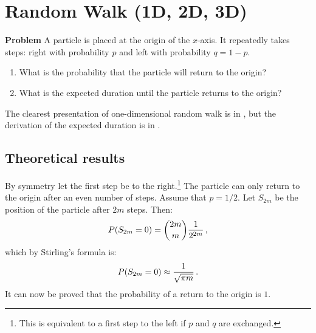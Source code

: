 
\section{Random Walk (1D, 2D, 3D)}\label{s.walk}

\textbf{Problem} A particle is placed at the origin of the $x$-axis. It repeatedly takes steps: right with probability $p$ and left with probability $q=1-p$.
\begin{enumerate}
\item What is the probability that the particle will return to the origin?
\item What is the expected duration until the particle returns to the origin?
\end{enumerate}
\begin{center}
\end{center}
The clearest presentation of one-dimensional random walk is in \cite{border}, but the derivation of the expected duration is in \cite{privault}.

\subsection{Theoretical results}

By symmetry let the first step be to the right.\footnote{This is equivalent to a first step to the left if $p$ and $q$ are exchanged.} The particle can only return to the origin after an even number of steps. Assume that $p=1/2$. Let $S_{2m}$ be the position of the particle after $2m$ steps. Then:
\[
P(S_{2m}=0) = \displaystyle{2m \choose m}\displaystyle\frac{1}{2^{2m}}\,,
\]
which by Stirling's formula is:
\[
P(S_{2m}=0) \approx \displaystyle\frac{1}{\sqrt{\pi m}}\,.
\]
It can now be proved that the probability of a return to the origin is $1$.

